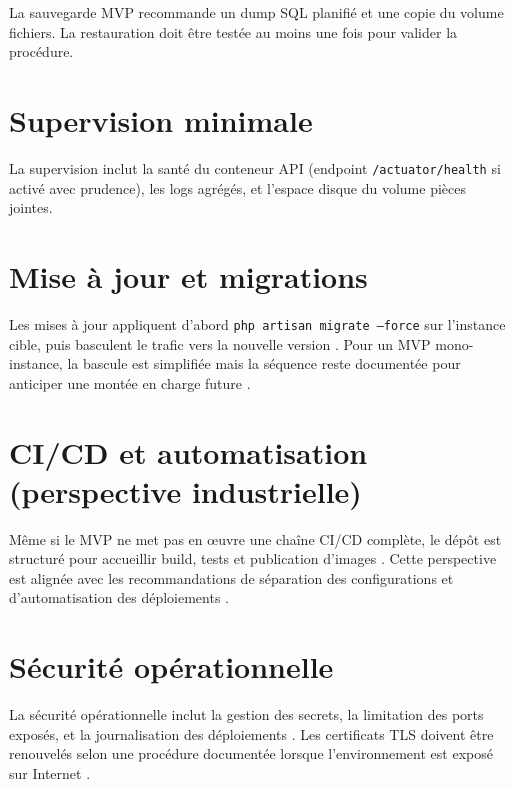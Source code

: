 La sauvegarde MVP recommande un dump SQL planifié et une copie du volume fichiers. La restauration doit être testée au moins une fois pour valider la procédure.

\section{Supervision minimale}

La supervision inclut la santé du conteneur API (endpoint \texttt{/actuator/health} si activé avec prudence), les logs agrégés, et l'espace disque du volume pièces jointes.

\section{Mise à jour et migrations}

Les mises à jour appliquent d'abord \texttt{php artisan migrate --force} sur l'instance cible, puis basculent le trafic vers la nouvelle version \cite{kleppmann2017,postgresdoc}. Pour un MVP mono-instance, la bascule est simplifiée mais la séquence reste documentée pour anticiper une montée en charge future \cite{newman2021}.

\section{CI/CD et automatisation (perspective industrielle)}

Même si le MVP ne met pas en œuvre une chaîne CI/CD complète, le dépôt est structuré pour accueillir build, tests et publication d'images \cite{sommerville2016}. Cette perspective est alignée avec les recommandations de séparation des configurations et d'automatisation des déploiements \cite{twelvefactor,dockerdoc}.

\section{Sécurité opérationnelle}

La sécurité opérationnelle inclut la gestion des secrets, la limitation des ports exposés, et la journalisation des déploiements \cite{owasp2021}. Les certificats TLS doivent être renouvelés selon une procédure documentée lorsque l'environnement est exposé sur Internet \cite{rfc7231}.

